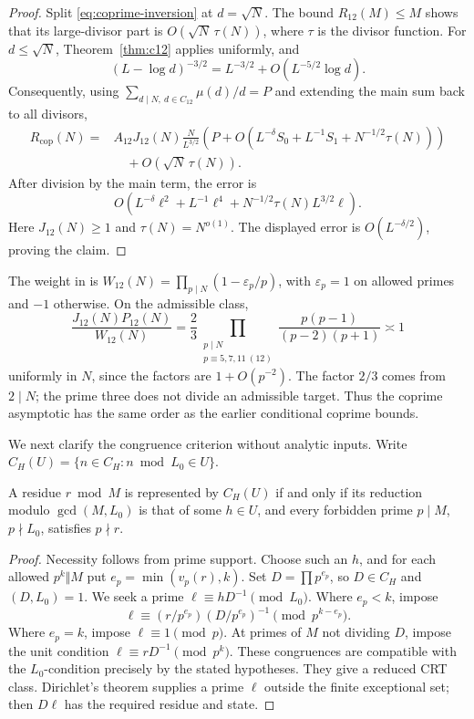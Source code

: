 \begin{proof}
Split \eqref{eq:coprime-inversion} at \(d=\sqrt N\).
The bound \(R_{12}(M)\le M\) shows that its large-divisor part is
\(O(\sqrt N\,\tau(N))\), where \(\tau\) is the divisor function.
For \(d\le\sqrt N\), Theorem~\ref{thm:c12} applies uniformly, and
\[
 (L-\log d)^{-3/2}
       =L^{-3/2}+O(L^{-5/2}\log d).
\]
Consequently, using \(\sum_{d\mid N,\ d\in C_{12}}\mu(d)/d=P\)
and extending the main sum back to all divisors,
\begin{align*}
 R_{\mathrm{cop}}(N)
 ={}&A_{12}J_{12}(N)\frac{N}{L^{3/2}}
       \left(P+O(L^{-\delta}S_0+L^{-1}S_1
                            +N^{-1/2}\tau(N))\right)\\
 &\quad+O(\sqrt N\,\tau(N)).
\end{align*}
After division by the main term, the error is
\[
 O\!\left(L^{-\delta}\ell^2+L^{-1}\ell^4
                  +N^{-1/2}\tau(N)L^{3/2}\ell\right).
\]
Here \(J_{12}(N)\ge1\) and \(\tau(N)=N^{o(1)}\).
The displayed error is \(O(L^{-\delta/2})\), proving the claim.
\end{proof}

\begin{remark}
The weight in \cite[Theorem 2]{iwaniecpomykala} is
\(W_{12}(N)=\prod_{p\mid N}(1-\varepsilon_p/p)\), with
\(\varepsilon_p=1\) on allowed primes and \(-1\) otherwise.
On the admissible class,
\[
 \frac{J_{12}(N)P_{12}(N)}{W_{12}(N)}
 =\frac23\prod_{\substack{p\mid N\\p\equiv5,7,11\ (12)}}
                 \frac{p(p-1)}{(p-2)(p+1)}\asymp1
\]
uniformly in \(N\), since the factors are \(1+O(p^{-2})\).
The factor \(2/3\) comes from \(2\mid N\); the prime three does
not divide an admissible target. Thus the coprime asymptotic has
the same order as the earlier conditional coprime bounds.
\end{remark}

We next clarify the congruence criterion without analytic inputs.
Write \(C_H(U)=\{n\in C_H:n\bmod L_0\in U\}\).
\begin{lemma}\label{lem:finite-images}
A residue \(r\bmod M\) is represented by \(C_H(U)\) if and only if
its reduction modulo \(\gcd(M,L_0)\) is that of some \(h\in U\),
and every forbidden prime \(p\mid M\), \(p\nmid L_0\), satisfies
\(p\nmid r\).
\end{lemma}
\begin{proof}
Necessity follows from prime support. Choose such an \(h\), and for
each allowed \(p^k\Vert M\) put \(e_p=\min(v_p(r),k)\).
Set \(D=\prod p^{e_p}\), so \(D\in C_H\) and \((D,L_0)=1\).
We seek a prime \(\ell\equiv hD^{-1}\pmod{L_0}\).
Where \(e_p<k\), impose
\[
 \ell\equiv(r/p^{e_p})(D/p^{e_p})^{-1}\pmod{p^{k-e_p}}.
\]
Where \(e_p=k\), impose \(\ell\equiv1\pmod p\).
At primes of \(M\) not dividing \(D\), impose the unit condition
\(\ell\equiv rD^{-1}\pmod{p^k}\). These congruences are compatible
with the \(L_0\)-condition precisely by the stated hypotheses.
They give a reduced CRT class. Dirichlet's theorem supplies a prime
\(\ell\) outside the finite exceptional set; then \(D\ell\) has
the required residue and state.
\end{proof}

